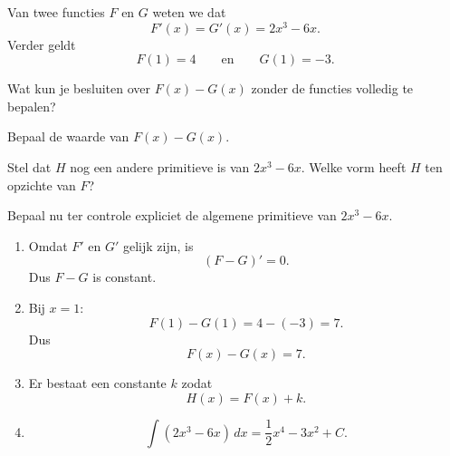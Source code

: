 \documentclass{ximera}
\begin{document}

\begin{oefening}{\oefG}

Van twee functies $F$ en $G$ weten we dat
\[
F'(x)=G'(x)=2x^3-6x.
\]
Verder geldt
\[
F(1)=4
\qquad\text{en}\qquad
G(1)=-3.
\]

\begin{question}
Wat kun je besluiten over $F(x)-G(x)$ zonder de functies volledig te bepalen?
\end{question}

\begin{question}
Bepaal de waarde van $F(x)-G(x)$.
\end{question}

\begin{question}
Stel dat $H$ nog een andere primitieve is van $2x^3-6x$. Welke vorm heeft $H$ ten opzichte van $F$?
\end{question}

\begin{question}
Bepaal nu ter controle expliciet de algemene primitieve van $2x^3-6x$.
\end{question}

\begin{oplossing}

\begin{enumerate}
\item Omdat $F'$ en $G'$ gelijk zijn, is
\[
(F-G)'=0.
\]
Dus $F-G$ is constant.

\item Bij $x=1$:
\[
F(1)-G(1)=4-(-3)=7.
\]
Dus
\[
\boxed{F(x)-G(x)=7.}
\]

\item Er bestaat een constante $k$ zodat
\[
H(x)=F(x)+k.
\]

\item
\[
\int (2x^3-6x)\,dx
=\frac12x^4-3x^2+C.
\]
\end{enumerate}

\end{oplossing}

\end{oefening}
\end{document}
